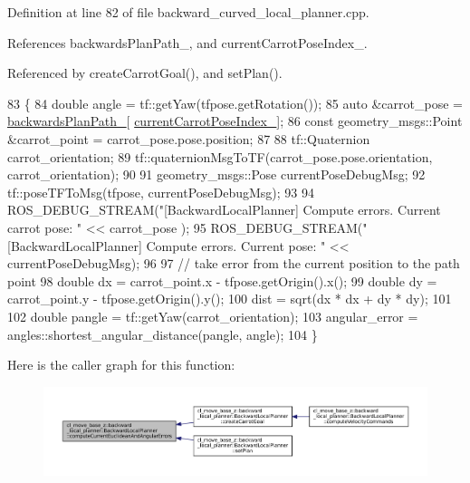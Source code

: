 Definition at line 82 of file backward\+\_\+curved\+\_\+local\+\_\+planner.\+cpp.



References backwards\+Plan\+Path\+\_\+, and current\+Carrot\+Pose\+Index\+\_\+.



Referenced by create\+Carrot\+Goal(), and set\+Plan().


\begin{DoxyCode}
83         \{
84             \textcolor{keywordtype}{double} angle = tf::getYaw(tfpose.getRotation());
85             \textcolor{keyword}{auto} &carrot\_pose = \hyperlink{classcl__move__base__z_1_1backward__local__planner_1_1BackwardLocalPlanner_ad9cde5c85f782cab2ddb4030e3c3f2cf}{backwardsPlanPath\_}[
      \hyperlink{classcl__move__base__z_1_1backward__local__planner_1_1BackwardLocalPlanner_a2e8f2b78bc97f27c5fa431f3af2261ed}{currentCarrotPoseIndex\_}];
86             \textcolor{keyword}{const} geometry\_msgs::Point &carrot\_point = carrot\_pose.pose.position;
87             
88             tf::Quaternion carrot\_orientation;
89             tf::quaternionMsgToTF(carrot\_pose.pose.orientation, carrot\_orientation);
90 
91             geometry\_msgs::Pose currentPoseDebugMsg;
92             tf::poseTFToMsg(tfpose, currentPoseDebugMsg);
93 
94             ROS\_DEBUG\_STREAM(\textcolor{stringliteral}{"[BackwardLocalPlanner] Compute errors. Current carrot pose: "} <<  carrot\_pose
      );
95             ROS\_DEBUG\_STREAM(\textcolor{stringliteral}{"[BackwardLocalPlanner] Compute errors. Current pose: "} <<  
      currentPoseDebugMsg);
96 
97             \textcolor{comment}{// take error from the current position to the path point}
98             \textcolor{keywordtype}{double} dx = carrot\_point.x - tfpose.getOrigin().x();
99             \textcolor{keywordtype}{double} dy = carrot\_point.y - tfpose.getOrigin().y();
100             dist = sqrt(dx * dx + dy * dy);
101 
102             \textcolor{keywordtype}{double} pangle = tf::getYaw(carrot\_orientation);
103             angular\_error = angles::shortest\_angular\_distance(pangle, angle);
104         \}
\end{DoxyCode}
Here is the caller graph for this function\+:
\nopagebreak
\begin{figure}[H]
\begin{center}
\leavevmode
\includegraphics[width=350pt]{classcl__move__base__z_1_1backward__local__planner_1_1BackwardLocalPlanner_a843f030138afe0a28cf11a729fa67383_icgraph}
\end{center}
\end{figure}
